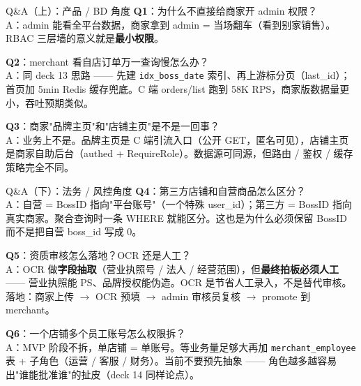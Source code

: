 \begin{frame}{Q\&A（上）：产品 / BD 角度}
\textbf{Q1}：为什么不直接给商家开 admin 权限？\\
\hspace{4mm}\small A：admin 能看全平台数据，商家拿到 admin = 当场翻车（看到别家销售）。RBAC 三层墙的意义就是\textbf{最小权限}。

\vspace{2mm}
\textbf{Q2}：merchant 看自店订单万一查询慢怎么办？\\
\hspace{4mm}\small A：同 deck 13 思路 —— 先建 \texttt{idx\_boss\_date} 索引、再上游标分页（last\_id）；首页加 5min Redis 缓存兜底。C 端 orders/list 跑到 58K RPS，商家版数据量更小，吞吐预期类似。

\vspace{2mm}
\textbf{Q3}：商家"品牌主页"和"店铺主页"是不是一回事？\\
\hspace{4mm}\small A：业务上不是。品牌主页是 C 端引流入口（公开 GET，匿名可见），店铺主页是商家自助后台（authed + RequireRole）。数据源可同源，但路由 / 鉴权 / 缓存策略完全不同。
\end{frame}

\begin{frame}{Q\&A（下）：法务 / 风控角度}
\textbf{Q4}：第三方店铺和自营商品怎么区分？\\
\hspace{4mm}\small A：自营 = BossID 指向"平台账号"（一个特殊 user\_id）；第三方 = BossID 指向真实商家。聚合查询时一条 WHERE 就能区分。这也是为什么必须保留 BossID 而不是把自营 boss\_id 写成 0。

\vspace{2mm}
\textbf{Q5}：资质审核怎么落地？OCR 还是人工？\\
\hspace{4mm}\small A：OCR 做\textbf{字段抽取}（营业执照号 / 法人 / 经营范围），但\textbf{最终拍板必须人工} —— 营业执照能 PS、品牌授权能伪造。OCR 是节省人工录入，不是替代审核。落地：商家上传 $\to$ OCR 预填 $\to$ admin 审核员复核 $\to$ promote 到 merchant。

\vspace{2mm}
\textbf{Q6}：一个店铺多个员工账号怎么权限拆？\\
\hspace{4mm}\small A：MVP 阶段不拆，单店铺 = 单账号。等业务量足够大再加 \texttt{merchant\_employee} 表 + 子角色（运营 / 客服 / 财务）。当前不要预先抽象 —— 角色越多越容易出"谁能批准谁"的扯皮（deck 14 同样论点）。
\end{frame}

